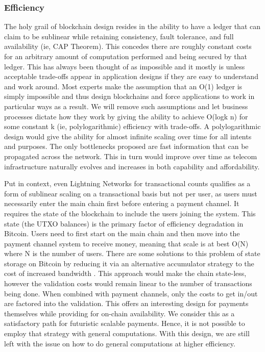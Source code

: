 \documentclass[peerreview]{ieeesyscoin}
\begin{document}
\subsubsection{Efficiency}

The holy grail of blockchain design resides in the ability to have a ledger that can claim to be sublinear while retaining consistency, fault tolerance, and full availability (ie, CAP Theorem). This concedes  there are roughly constant costs for an arbitrary amount of computation performed and being secured by that ledger. This has always been thought of as impossible and it mostly is unless acceptable trade-offs appear in application designs if  they are easy to understand and work around. Most experts make the assumption that an O(1) ledger is simply impossible and thus design blockchains and force applications to work in particular ways as a result. We will remove such assumptions and let business processes dictate how they work by giving the ability to achieve O(logk n) for some constant k (ie, polylogarithmic) efficiency with trade-offs. A polylogarithmic design would give the ability for almost infinite scaling over time for all intents and purposes. The only bottlenecks proposed are fast information that can be propagated across the network. This in turn would improve over time as telecom infrastructure naturally evolves and increases in both capability and affordability.

Put in context, even Lightning Networks for transactional counts qualifies as a form of sublinear scaling on a transactional basis but not per user, as users must necessarily enter the main chain first before entering a payment channel. It requires the state of the blockchain to include the users joining the system. This state (the UTXO balances) is the primary  factor of efficiency degradation in Bitcoin. Users need to first start on the main chain and then move into the payment channel system to receive money, meaning that scale is at best O(N) where N is the number of users. There are some solutions to this problem of state storage on Bitcoin by reducing it via an alternative accumulator strategy to the cost of increased bandwidth \cite{Dry19}. This approach would make the chain state-less,  however the validation costs would remain linear to the number of transactions being done. When combined with payment channels, only the costs to get in/out are factored into the validation. This offers an interesting design for payments themselves while providing for on-chain availability. We consider this as a satisfactory path for futuristic scalable payments. Hence, it is not possible to employ that strategy with general computations. With this design, we are still left with the issue on how to do general computations at higher efficiency.
\end{document}
